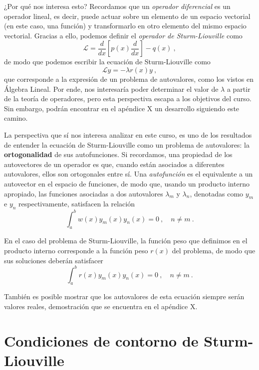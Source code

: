 ¿Por qué nos interesa esto? Recordamos que un \emph{operador diferencial} es un operador lineal, es decir, puede actuar sobre un elemento de un espacio vectorial (en este caso, una función) y transformarlo en otro elemento del mismo espacio vectorial. Gracias a ello, podemos definir el \emph{operador de Sturm-Liouville} como
\begin{equation}
    \mathcal{L} = \frac{d}{dx}\left[p(x) \frac{d}{dx}\right] - q(x) \ ,
\end{equation}
de modo que podemos escribir la ecuación de Sturm-Liouville como
\begin{equation}
    \mathcal{L}y = -\lambda r(x) y \ ,
\end{equation}
que corresponde a la expresión de un problema de autovalores, como los vistos en Álgebra Lineal. Por ende, nos interesaría poder determinar el valor de $\lambda$ a partir de la teoría de operadores, pero esta perspectiva escapa a los objetivos del curso. Sin embargo, podrán encontrar en el apéndice X un desarrollo siguiendo este camino.

La perspectiva que sí nos interesa analizar en este curso, es uno de los resultados de entender la ecuación de Sturm-Liouville como un problema de autovalores: la \textbf{ortogonalidad} de sus autofunciones. Si recordamos, una propiedad de los autovectores de un operador es que, cuando están asociados a diferentes autovalores, ellos son ortogonales entre sí. Una \emph{autofunción} es el equivalente a un autovector en el espacio de funciones, de modo que, usando un producto interno apropiado, las funciones asociadas a dos autovalores $\lambda_m$ y $\lambda_n$, denotadas como $y_m$ e $y_n$ respectivamente, satisfacen la relación
\begin{equation}
    \int_a^b w(x) y_m(x) y_n(x) = 0 \ , \quad n \neq m \ .
\end{equation}

En el caso del problema de Sturm-Liouville, la función peso que definimos en el producto interno corresponde a la función peso $r(x)$ del problema, de modo que sus soluciones deberán satisfacer
\begin{equation}
    \int_a^b r(x) y_m(x) y_n(x) = 0 \ , \quad n \neq m \ .
\end{equation}

También es posible mostrar que los autovalores de esta ecuación siempre serán valores reales, demostración que se encuentra en el apéndice X.

\section{Condiciones de contorno de Sturm-Liouville}

